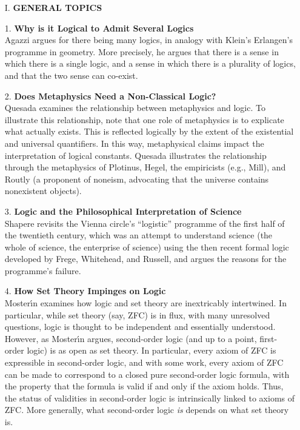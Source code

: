 \documentclass[11pt]{article}
\newcommand{\<}{\langle}
\renewcommand{\>}{\rangle}
\begin{document}
\begin{itemize}
\item[I.] \textbf{GENERAL TOPICS}

\item[1.] \textbf{Why is it Logical to Admit Several Logics}\\ Agazzi
  argues for there being many logics, in analogy with Klein's
  Erlangen's programme in geometry.
  More precisely, he argues that there is a sense in which there is a
  single logic, and a sense in which there is a plurality of logics,
and that the two sense can co-exist.

\item[2.] \textbf{Does Metaphysics Need a Non-Classical Logic?}\\
Quesada examines the relationship between metaphysics and logic. To
illustrate this relationship, note that one role of metaphysics is to
explicate what actually exists. This is reflected logically by the
extent of the existential and universal quantifiers. In this way,
metaphysical claims impact the interpretation of logical
constants. Quesada illustrates the relationship through the
metaphysics of Plotinus, Hegel, the empiricists (e.g., Mill), and
Routly (a proponent of noneism, advocating that the universe contains
nonexistent objects). 

\item[3.] \textbf{Logic and the Philosophical Interpretation of
Science}\\
Shapere revisits the Vienna circle's ``logistic'' programme of the first half
of the twentieth century, which was an attempt to understand science
(the whole of science, the enterprise of science) using the then
recent formal logic developed by Frege, Whitehead, and Russell, and
argues the reasons for the programme's failure. 

\item[4.] \textbf{How Set Theory Impinges on Logic}\\
Moster\'{\i}n examines how
logic and set theory are inextricably intertwined. 
In particular, while set theory (say, ZFC) is in flux, with many
unresolved questions, logic is thought to be independent and
essentially understood. However, as Moster\'{\i}n argues, second-order
logic (and up to a point, first-order logic) is as open as set
theory. In particular, every axiom of ZFC is expressible in
second-order logic, and with some work, every axiom of ZFC can be made
to correspond to a closed pure second-order logic formula, with the
property that the formula is valid if and only if the axiom
holds. Thus, the status of validities in second-order logic is
intrinsically linked to axioms of ZFC. More generally, what
second-order logic \emph{is} depends on what set theory is.


\end{itemize}
\end{document}
